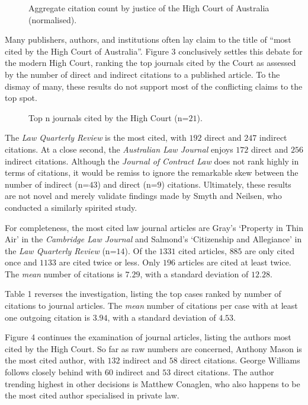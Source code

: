 \begin{figure}[!htpb]
    \centering
    
    \caption{Aggregate citation count by justice of the High Court of Australia (normalised).}
\end{figure}

Many publishers, authors, and institutions often lay claim to the title of ``most cited by the High Court of Australia''. Figure 3 conclusively settles this debate for the modern High Court, ranking the top journals cited by the Court as assessed by the number of direct and indirect citations to a published article. To the dismay of many, these results do not support most of the conflicting claims to the top spot.

\begin{figure}[!htpb]
    \centering
    \makebox[\textwidth][c]{}
    \caption{Top n journals cited by the High Court (n=$21$).}
\end{figure}

The \emph{Law Quarterly Review} is the most cited, with $192$ direct and $247$ indirect citations. At a close second, the \emph{Australian Law Journal} enjoys $172$ direct and $256$ indirect citations. Although the \emph{Journal of Contract Law} does not rank highly in terms of citations, it would be remiss to ignore the remarkable skew between the number of indirect (n=$43$) and direct (n=$9$) citations. Ultimately, these results are not novel and merely validate findings made by Smyth and Neilsen, who conducted a similarly spirited study.

For completeness, the most cited law journal articles are Gray's `Property in Thin Air' in the \textit{Cambridge Law Journal} and Salmond's `Citizenship and Allegiance' in the \textit{Law Quarterly Review} (n=$14$). Of the $1331$ cited articles, $885$ are only cited once and $1133$ are cited twice or less. Only $196$ articles are cited at least twice. The \emph{mean} number of citations is $7.29$, with a standard deviation of $12.28$.

Table 1 reverses the investigation, listing the top cases ranked by number of citations to journal articles. The \emph{mean} number of citations per case with at least one outgoing citation is $3.94$, with a standard deviation of $4.53$. 

Figure 4 continues the examination of journal articles, listing the authors most cited by the High Court. So far as raw numbers are concerned, Anthony Mason is the most cited author, with $132$ indirect and $58$ direct citations. George Williams follows closely behind with $60$ indirect and $53$ direct citations. The author trending highest in other decisions is Matthew Conaglen, who also happens to be the most cited author specialised in private law.

